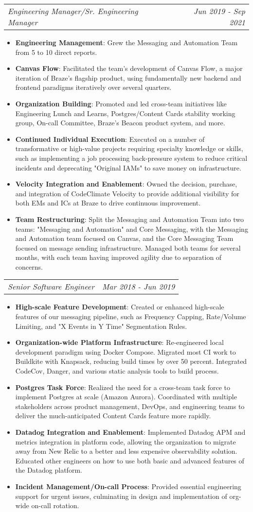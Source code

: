 \documentclass[letterpaper,10pt]{article}
\makeatletter
\newcommand{\resumeItem}[2]{
  \item\small{
    \textbf{#1}{: #2 \vspace{-2pt}}
  }
}
\newcommand{\resumeSubSubheading}[2]{
    \begin{tabular*}{0.97\textwidth}{l@{\extracolsep{\fill}}r}
      \textit{\small#1} & \textit{\small #2} \\
    \end{tabular*}\vspace{-5pt}
}
\newcommand{\resumeItemListStart}{\begin{itemize}}
\newcommand{\resumeItemListEnd}{\end{itemize}\vspace{-5pt}}
\makeatother
\begin{document}
    \resumeSubSubheading
      {Engineering Manager/Sr. Engineering Manager}{Jun 2019 - Sep 2021}
       \resumeItemListStart
        \resumeItem{Engineering Management}
          {Grew the Messaging and Automation Team from 5 to 10 direct reports.}
        \resumeItem{Canvas Flow}
          {Facilitated the team's development of Canvas Flow, a major iteration of Braze's flagship product, using fundamentally new backend and frontend paradigms iteratively over several quarters.}
        \resumeItem{Organization Building}
          {Promoted and led cross-team initiatives like Engineering Lunch and Learns, Postgres/Content Cards stability working group, On-call Committee, Braze's Beacon product system, and more.}
        \resumeItem{Continued Individual Execution}
          {Executed on a number of transformative or high-value projects requiring specialty knowledge or skills, such as implementing a job processing back-pressure system to reduce critical incidents and deprecating "Original IAMs" to save money on infrastructure.}
        \resumeItem{Velocity Integration and Enablement}
          {Owned the decision, purchase, and integration of CodeClimate Velocity to provide additional visibility for both EMs and ICs at Braze to drive continuous improvement.}
        \resumeItem{Team Restructuring}
          {Split the Messaging and Automation Team into two teams: "Messaging and Automation" and Core Messaging, with the Messaging and Automation team focused on Canvas, and the Core Messaging Team focused on message sending infrastructure. Managed both teams for several months, with each team having improved agility due to separation of concerns.}
      \resumeItemListEnd
      
    \resumeSubSubheading
      {Senior Software Engineer}{Mar 2018 - Jun 2019}
      \resumeItemListStart
        \resumeItem{High-scale Feature Development}
          {Created or enhanced high-scale features of our messaging pipeline, such as Frequency Capping, Rate/Volume Limiting, and "X Events in Y Time" Segmentation Rules.}
        \resumeItem{Organization-wide Platform Infrastructure}
          {Re-engineered local development paradigm using Docker Compose. Migrated most CI work to Buildkite with Knapsack, reducing build times by over 50 percent. Integrated CodeCov, Danger, and various static analysis tools to build process.}
        \resumeItem{Postgres Task Force}
          {Realized the need for a cross-team task force to implement Postgres at scale (Amazon Aurora). Coordinated with multiple stakeholders across product management, DevOps, and engineering teams to deliver the much-anticipated Content Cards feature more rapidly.}
        \resumeItem{Datadog Integration and Enablement}
          {Implemented Datadog APM and metrics integration in platform code, allowing the organization to migrate away from New Relic to a better and less expensive observability solution. Educated other engineers on how to use both basic and advanced features of the Datadog platform.}
        \resumeItem{Incident Management/On-call Process}
          {Provided essential engineering support for urgent issues, culminating in design and implementation of org-wide on-call rotation.}
      \resumeItemListEnd
\end{document}
